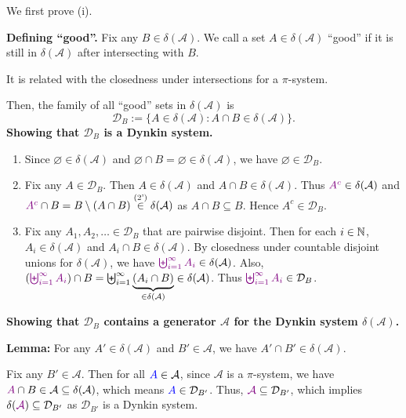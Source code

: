 \begin{enumerate}
\begin{pf}
We first prove (i).

\textbf{Defining ``good''.} Fix any \(B\in\delta(\mathcal{A})\). We call a set
\(A\in\delta(\mathcal{A})\) ``good'' if it is still in \(\delta(\mathcal{A})\)
after intersecting with \(B\). \begin{intuition}
It is related with the closedness under intersections for a \(\pi\)-system.
\end{intuition}
Then, the family of all ``good'' sets in \(\delta(\mathcal{A})\) is
\[
\mathcal{D}_{B}:=\{A\in\delta(\mathcal{A}):A\cap B\in\delta(\mathcal{A})\}.
\]
\textbf{Showing that \(\mathcal{D}_{B}\) is a Dynkin system.}
\begin{enumerate}[label={(\arabic*)}]
\item Since \(\varnothing\in\delta(\mathcal{A})\) and \(\varnothing\cap
B=\varnothing\in\delta(\mathcal{A})\), we have \(\varnothing\in\mathcal{D}_{B}\).
\item Fix any \(A\in\mathcal{D}_{B}\). Then \(A\in\delta(\mathcal{A})\) and
\(A\cap B\in\delta(\mathcal{A})\). Thus \(\vc{A^c}\in\delta(\mathcal{A})\) and
\(\vc{A^c}\cap B=B\setminus (A\cap B)\overset{\text{(2')}}{\in}\delta(\mathcal{A})\) as \(A\cap B\subseteq B\).
Hence \(A^c\in\mathcal{D}_{B}\).
\item Fix any \(A_1,A_2,\dotsc\in\mathcal{D}_{B}\) that are pairwise disjoint.
Then for each \(i\in\mathbb{N}\), \(A_i\in\delta(\mathcal{A})\) and \(A_i\cap B\in\delta(\mathcal{A})\).
By closedness under countable disjoint unions for \(\delta(\mathcal{A})\), we have
\(\vc{\biguplus_{i=1}^{\infty}A_i}\in\delta(\mathcal{A})\). Also,
\((\vc{\biguplus_{i=1}^{\infty}A_i})\cap B
=\biguplus_{i=1}^{\infty}\underbrace{(A_i\cap B)}_{\in\delta(\mathcal{A})}
\in \delta(\mathcal{A})\). Thus \(\vc{\biguplus_{i=1}^{\infty}A_i}\in\mathcal{D}_{B}\).
\end{enumerate}
\textbf{Showing that \(\mathcal{D}_{B}\) contains a generator \(\mathcal{A}\) for the Dynkin system \(\delta(\mathcal{A})\).}

\textbf{Lemma:} For any \(A'\in\delta(\mathcal{A})\) and \(B'\in\mathcal{A}\), we have
\(A'\cap B'\in\delta(\mathcal{A})\).

\begin{pf}
Fix any \(B'\in\mathcal{A}\). Then for all \(\blc{A}\in\mathcal{A}\), since
\(\mathcal{A}\) is a \(\pi\)-system, we have \(\vc{A}\cap
B\in\mathcal{A}\subseteq \delta(\mathcal{A})\), which means
\(\blc{A}\in\mathcal{D}_{B'}\). Thus, \(\vc{\mathcal{A}}\subseteq
\mathcal{D}_{B'}\), which implies \(\delta(\vc{\mathcal{A}})\subseteq
\mathcal{D}_{B'}\) as \(\mathcal{D}_{B'}\) is a Dynkin system.


\end{pf}
\end{pf}
\end{enumerate}

